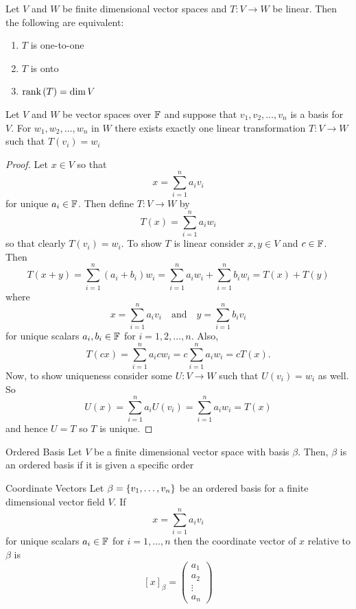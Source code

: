 \documentclass{exam}
\begin{document}
    \begin{thm}{}{}
        Let $V$ and $W$ be finite dimensional vector spaces and $T: V \to W$ be linear. Then the following are equivalent: 
        \begin{enumerate}
            \item $T$ is one-to-one 
            \item $T$ is onto 
            \item $\text{rank}\left(T\right) = \dim V$
        \end{enumerate}
    \end{thm}


    \begin{thm}{}{}
        Let $V$ and $W$ be vector spaces over $\mathbb F$ and suppose that ${v_1, v_2, \dots, v_n}$ is a basis for $V$. For $w_1, w_2, \dots, w_n$ in $W$ there exists exactly one linear transformation $T: V \to W$ such that $T(v_i) = w_i$
        \begin{proof}
            Let $x \in V$ so that 
            \[
                x = \sum_{i=1}^{n} a_i v_i
            \]
            for unique $a_i \in \mathbb F$. Then define $T: V \to W$ by 
            \[
                T(x) = \sum_{i=1}^{n} a_i w_i
            \]
            so that clearly $T(v_i) = w_i$. To show $T$ is linear consider $x, y \in V$ and $c \in \mathbb F$. Then 
            \[
                T(x + y) = \sum_{i = 1}^{n}(a_i + b_i)w_i = \sum_{i=1}^{n}a_i w_i + \sum_{i=1}^n b_i w_i = T(x) + T(y)
            \]
            where 
            \[
                x = \sum_{i=1}^{n}a_i v_i \quad\text{and}\quad y = \sum_{i=1}^{n}b_i v_i
            \]
            for unique scalars $a_i, b_i \in \mathbb F$ for $i = 1, 2, \dots, n$. Also, 
            \[
                T(cx) = \sum_{i=1}^{n} a_i c w_i = c \sum_{i=1}^n a_i w_i = cT(x).
            \]
            Now, to show uniqueness consider some $U: V \to W$ such that $U(v_i) = w_i$ as well. So 
            \[
                U(x) = \sum_{i=1}^n a_i U(v_i) = \sum_{i=1}^n a_i w_i = T(x)
            \]
            and hence $U = T$ so $T$ is unique.
        \end{proof}
    \end{thm}

    \begin{defbox}{Ordered Basis}
        Let $V$ be a finite dimensional vector space with basis $\beta$. Then, $\beta$ is an ordered basis if it is given a specific order
    \end{defbox}

    \begin{defbox}{Coordinate Vectors}
        Let $\beta = \left\{v_1, \dots, v_n \right\}$ be an ordered basis for a finite dimensional vector field $V$. If 
        \[
            x = \sum_{i=1}^n a_i v_i
        \]
        for unique scalars $a_i \in \mathbb F$ for $i = 1, \dots, n$ then the coordinate vector of $x$ relative to $\beta$ is 
        \[
            [x]_\beta = \begin{pmatrix}
                a_1 \\ a_2 \\ \vdots \\ a_n
            \end{pmatrix}
        \]
    \end{defbox}
\end{document}

